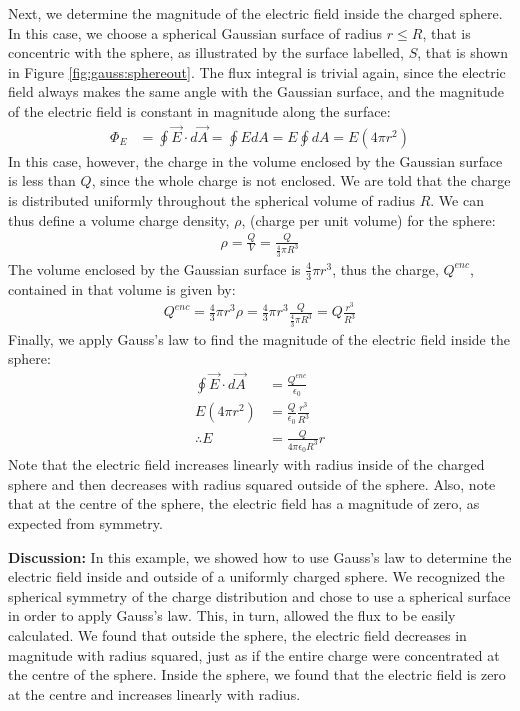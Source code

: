 \begin{example}
Next, we determine the magnitude of the electric field inside the charged sphere. In this case, we choose a spherical Gaussian surface of radius $r\leq R$, that is concentric with the sphere, as illustrated by the surface labelled, $S$, that is shown in Figure \ref{fig:gauss:sphereout}.
The flux integral is trivial again, since the electric field always makes the same angle with the Gaussian surface, and the magnitude of the electric field is constant in magnitude along the surface:
\begin{align*}
\Phi_E&=\oint \vec E\cdot d\vec A=\oint E dA= E\oint dA=E(4\pi r^2)
\end{align*}
In this case, however, the charge in the volume enclosed by the Gaussian surface is less than $Q$, since the whole charge is not enclosed. We are told that the charge is distributed uniformly throughout the spherical volume of radius $R$. We can thus define a volume charge density, $\rho$, (charge per unit volume) for the sphere:
\begin{align*}
\rho=\frac{Q}{V}=\frac{Q}{\frac{4}{3}\pi R^3}
\end{align*}
The volume enclosed by the Gaussian surface is $\frac{4}{3}\pi r^3$, thus the charge, $Q^{enc}$, contained in that volume is given by:
\begin{align*}
Q^{enc}=\frac{4}{3}\pi r^3 \rho=\frac{4}{3}\pi r^3 \frac{Q}{\frac{4}{3}\pi R^3}=Q\frac{r^3}{R^3}
\end{align*}
Finally, we apply Gauss's law to find the magnitude of the electric field inside the sphere:
\begin{align*}
\oint \vec E\cdot d\vec A&=\frac{Q^{enc}}{\epsilon_0} \\
E(4\pi r^2) &=\frac{Q}{\epsilon_0}\frac{r^3}{R^3}\\
\therefore E&= \frac{Q}{4\pi\epsilon_0R^3}r
\end{align*}
Note that the electric field increases linearly with radius inside of the charged sphere and then decreases with radius squared outside of the sphere. Also, note that at the centre of the sphere, the electric field has a magnitude of zero, as expected from symmetry.

\textbf{Discussion: } In this example, we showed how to use Gauss's law to determine the electric field inside and outside of a uniformly charged sphere. We recognized the spherical symmetry of the charge distribution and chose to use a spherical surface in order to apply Gauss's law.  This, in turn, allowed the flux to be easily calculated. We found that outside the sphere, the electric field decreases in magnitude with radius squared, just as if the entire charge were concentrated at the centre of the sphere. Inside the sphere, we found that the electric field is zero at the centre and increases linearly with radius. 
\end{example}
